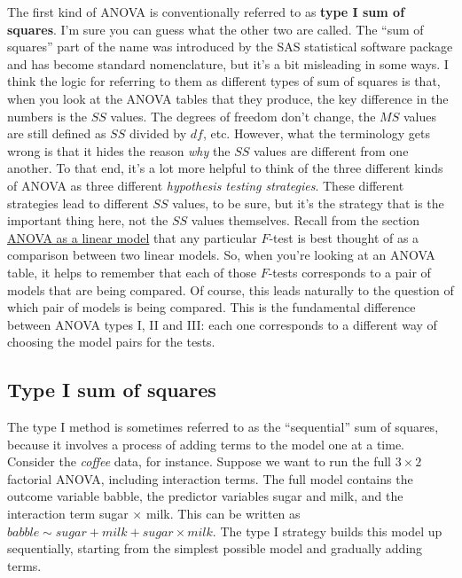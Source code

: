 \documentclass[
  a4paper,
]{book}
\begin{document}
The first kind of ANOVA is conventionally referred to as \textbf{type I
sum of squares}. I'm sure you can guess what the other two are called.
The ``sum of squares'' part of the name was introduced by the SAS
statistical software package and has become standard nomenclature, but
it's a bit misleading in some ways. I think the logic for referring to
them as different types of sum of squares is that, when you look at the
ANOVA tables that they produce, the key difference in the numbers is the
\(SS\) values. The degrees of freedom don't change, the \(MS\) values
are still defined as \(SS\) divided by \(df\), etc. However, what the
terminology gets wrong is that it hides the reason \emph{why} the \(SS\)
values are different from one another. To that end, it's a lot more
helpful to think of the three different kinds of ANOVA as three
different \emph{hypothesis testing strategies}. These different
strategies lead to different \(SS\) values, to be sure, but it's the
strategy that is the important thing here, not the \(SS\) values
themselves. Recall from the section
\protect\hyperlink{sec-ANOVA-as-a-linear-model}{ANOVA as a linear model}
that any particular \(F\)-test is best thought of as a comparison
between two linear models. So, when you're looking at an ANOVA table, it
helps to remember that each of those \(F\)-tests corresponds to a pair
of models that are being compared. Of course, this leads naturally to
the question of which pair of models is being compared. This is the
fundamental difference between ANOVA types I, II and III: each one
corresponds to a different way of choosing the model pairs for the
tests.

\hypertarget{type-i-sum-of-squares}{%
\subsection{Type I sum of squares}\label{type-i-sum-of-squares}}

The type I method is sometimes referred to as the ``sequential'' sum of
squares, because it involves a process of adding terms to the model one
at a time. Consider the \emph{coffee} data, for instance. Suppose we
want to run the full \(3 \times 2\) factorial ANOVA, including
interaction terms. The full model contains the outcome variable babble,
the predictor variables sugar and milk, and the interaction term sugar
\(\times\) milk. This can be written as
\(babble \sim sugar + milk + sugar {\times} milk\). The type I strategy
builds this model up sequentially, starting from the simplest possible
model and gradually adding terms.
\end{document}
